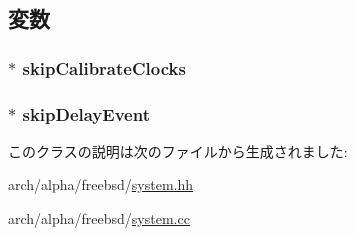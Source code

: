 \subsection{変数}
\hypertarget{classFreebsdAlphaSystem_ac0bba0dc3b6587b925fe7210556b8215}{
\subsubsection[{skipCalibrateClocks}]{$\ast$ {\bf skipCalibrateClocks}}}
\label{classFreebsdAlphaSystem_ac0bba0dc3b6587b925fe7210556b8215}
\hypertarget{classFreebsdAlphaSystem_a2701f201ba02c752cc7d29513c1e62e6}{
\subsubsection[{skipDelayEvent}]{$\ast$ {\bf skipDelayEvent}}}
\label{classFreebsdAlphaSystem_a2701f201ba02c752cc7d29513c1e62e6}


このクラスの説明は次のファイルから生成されました:\begin{DoxyCompactItemize}
\item 
arch/alpha/freebsd/\hyperlink{arch_2alpha_2freebsd_2system_8hh}{system.hh}\item 
arch/alpha/freebsd/\hyperlink{arch_2alpha_2freebsd_2system_8cc}{system.cc}\end{DoxyCompactItemize}
